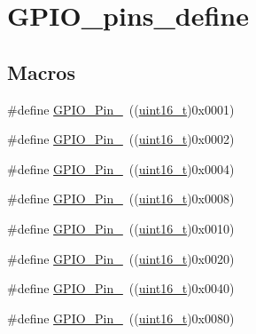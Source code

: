 \hypertarget{group___g_p_i_o__pins__define}{}\section{G\+P\+I\+O\+\_\+pins\+\_\+define}
\label{group___g_p_i_o__pins__define}
\subsection*{Macros}
\begin{DoxyCompactItemize}
\item 
\#define \hyperlink{group___g_p_i_o__pins__define_gab305b8d1be9f89bf2b4a05589b456049}{G\+P\+I\+O\+\_\+\+Pin\+\_}~((\hyperlink{_p_e___types_8h_a1f1825b69244eb3ad2c7165ddc99c956}{uint16\+\_\+t})0x0001)
\item 
\#define \hyperlink{group___g_p_i_o__pins__define_ga29db642c26f1fa0fffc3ecadcd30f82b}{G\+P\+I\+O\+\_\+\+Pin\+\_}~((\hyperlink{_p_e___types_8h_a1f1825b69244eb3ad2c7165ddc99c956}{uint16\+\_\+t})0x0002)
\item 
\#define \hyperlink{group___g_p_i_o__pins__define_gabdf6630324b2f99360537a310687187c}{G\+P\+I\+O\+\_\+\+Pin\+\_}~((\hyperlink{_p_e___types_8h_a1f1825b69244eb3ad2c7165ddc99c956}{uint16\+\_\+t})0x0004)
\item 
\#define \hyperlink{group___g_p_i_o__pins__define_ga763c6544859dbe28cd3f8ad820045556}{G\+P\+I\+O\+\_\+\+Pin\+\_}~((\hyperlink{_p_e___types_8h_a1f1825b69244eb3ad2c7165ddc99c956}{uint16\+\_\+t})0x0008)
\item 
\#define \hyperlink{group___g_p_i_o__pins__define_gacbf04d09b954606cdcc55eb2e81780e3}{G\+P\+I\+O\+\_\+\+Pin\+\_}~((\hyperlink{_p_e___types_8h_a1f1825b69244eb3ad2c7165ddc99c956}{uint16\+\_\+t})0x0010)
\item 
\#define \hyperlink{group___g_p_i_o__pins__define_ga32dbe930f52ce5ab60190c65e9dc741e}{G\+P\+I\+O\+\_\+\+Pin\+\_}~((\hyperlink{_p_e___types_8h_a1f1825b69244eb3ad2c7165ddc99c956}{uint16\+\_\+t})0x0020)
\item 
\#define \hyperlink{group___g_p_i_o__pins__define_gaf047899d873f27c2db9f50b342e35a58}{G\+P\+I\+O\+\_\+\+Pin\+\_}~((\hyperlink{_p_e___types_8h_a1f1825b69244eb3ad2c7165ddc99c956}{uint16\+\_\+t})0x0040)
\item 
\#define \hyperlink{group___g_p_i_o__pins__define_ga7346b6ce5507bd28a7a79e7dcc816c08}{G\+P\+I\+O\+\_\+\+Pin\+\_}~((\hyperlink{_p_e___types_8h_a1f1825b69244eb3ad2c7165ddc99c956}{uint16\+\_\+t})0x0080)

\end{DoxyCompactItemize}
